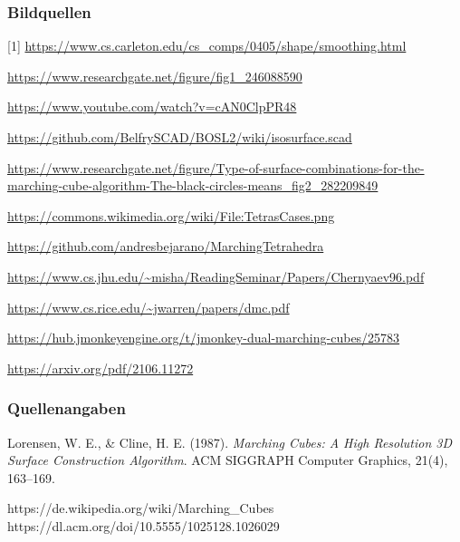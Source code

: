 \documentclass{beamer}
\begin{document}
\begin{frame}[t]
\frametitle{Bildquellen}
\tiny
\raggedright
[1] \url{https://www.cs.carleton.edu/cs_comps/0405/shape/smoothing.html}\par %
[2] \url{https://www.researchgate.net/figure/fig1_246088590}\par %
[3] \url{https://www.youtube.com/watch?v=cAN0ClpPR48}\par %
[4] \url{https://github.com/BelfrySCAD/BOSL2/wiki/isosurface.scad}\par %
[5] \url{https://www.researchgate.net/figure/Type-of-surface-combinations-for-the-marching-cube-algorithm-The-black-circles-means_fig2_282209849}\par
[6] \url{https://commons.wikimedia.org/wiki/File:TetrasCases.png}\par
[7] \url{https://github.com/andresbejarano/MarchingTetrahedra}\par %
[8] \url{https://www.cs.jhu.edu/~misha/ReadingSeminar/Papers/Chernyaev96.pdf}\par
[9] \url{https://www.cs.rice.edu/~jwarren/papers/dmc.pdf}\par %
[10] \url{https://hub.jmonkeyengine.org/t/jmonkey-dual-marching-cubes/25783}\par
[11] \url{https://arxiv.org/pdf/2106.11272}\par
\end{frame}

\begin{frame}[t]
\frametitle{Quellenangaben}
Lorensen, W. E., \& Cline, H. E. (1987). \textit{Marching Cubes: A High Resolution 3D Surface Construction Algorithm}. ACM SIGGRAPH Computer Graphics, 21(4), 163–169.\par
https://de.wikipedia.org/wiki/Marching_Cubes
https://dl.acm.org/doi/10.5555/1025128.1026029
\end{frame}
\end{document}
